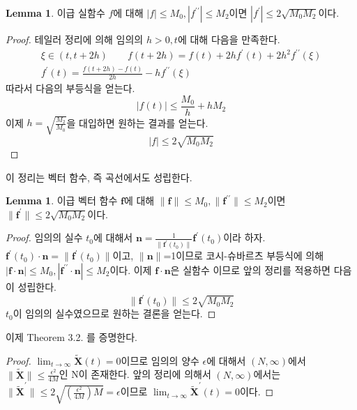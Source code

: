 \documentclass[a4paper,20pt]{article}
\theoremstyle{definition}
\newtheorem{lemma}[theorem]{Lemma}
\newcommand{\limit}[2][\infty]{\lim_{#2 \to #1}}
\newcommand{\curve}[1][X]{\tilde{\mathbf{#1}}}
\begin{document}
\begin{lemma}
이급 실함수 $f$에 대해 $|f| \leq M_{0}, |f^{\prime \prime}| \leq M_{2} $이면 $|f^{\prime}| \leq 2\sqrt{M_{0}M_{2}}$이다.
\end{lemma}

\begin{proof}
테일러 정리에 의해 임의의 $h>0, t$에 대해 다음을 만족한다.
\begin{eqnarray*}
\xi \in (t,t+2h) \qquad f(t+2h)=f(t)+2hf^{\prime}(t)+2h^{2}f^{\prime \prime}(\xi) \\
f^{\prime}(t)=\frac{f(t+2h)-f(t)}{2h}-hf^{\prime \prime}(\xi)
\end{eqnarray*}
따라서 다음의 부등식을 얻는다.
$$
|f(t)|\leq \frac{M_{0}}{h}+hM_{2}
$$
이제 $h=\sqrt{\frac{M_{2}}{M_{0}}}$을 대입하면 원하는 결과를 얻는다.
$$
|f|\leq 2\sqrt{M_{0}M_{2}}
$$
\end{proof}
이 정리는 벡터 함수, 즉 곡선에서도 성립한다.
\begin{lemma}
이급 벡터 함수 $\mathbf{f}$에 대해 $\|\mathbf{f}\| \leq M_{0}, \|\mathbf{f}^{\prime \prime}\| \leq M_{2} $이면 
$\|\mathbf{f}^{\prime}\| \leq 2\sqrt{M_{0}M_{2}}$이다. 
\end{lemma}
\begin{proof}
임의의 실수 $t_{0}$에 대해서 $\mathbf{n}=\frac{1}{\|\mathbf{f^{\prime}}(t_{0})\|}\mathbf{f^{\prime}}(t_0)$이라 하자. 
$\mathbf{f}^{\prime}(t_{0})\cdot\mathbf{n}=\|\mathbf{f}^{\prime}(t_{0})\|$이고, $\|\mathbf{n}\|$=1이므로 코시-슈바르츠 부등식에 의해 
$|\mathbf{f}\cdot\mathbf{n}|\leq M_{0}, |\mathbf{f}^{\prime \prime}\cdot\mathbf{n}|\leq M_{2}$이다. 
이제 $\mathbf{f}\cdot\mathbf{n}$은 실함수 이므로 앞의 정리를 적용하면 다음이 성립한다.
$$
\|\mathbf{f}^{\prime}(t_{0})\|\leq 2\sqrt{M_{0}M_{2}}
$$
$t_{0}$이 임의의 실수였으므로 원하는 결론을 얻는다.		
\end{proof}

\newpage
이제 Theorem 3.2. 를 증명한다. 
\begin{proof}
$\limit{t}\curve(t)=0$이므로 임의의 양수 $\epsilon$에 대해서 
$(N,\infty)$에서 $\|\curve\|\leq \frac{\epsilon^{2}}{4M}$인 N이 존재한다. 앞의 정리에 의해서 $(N,\infty)$에서는 $\|\curve^{\prime}\|\leq2\sqrt{(\frac{\epsilon^{2}}{4M}) M}=\epsilon$이므로 $\limit{t}\curve^{\prime}(t)=0$이다.
\end{proof}
\end{document}
